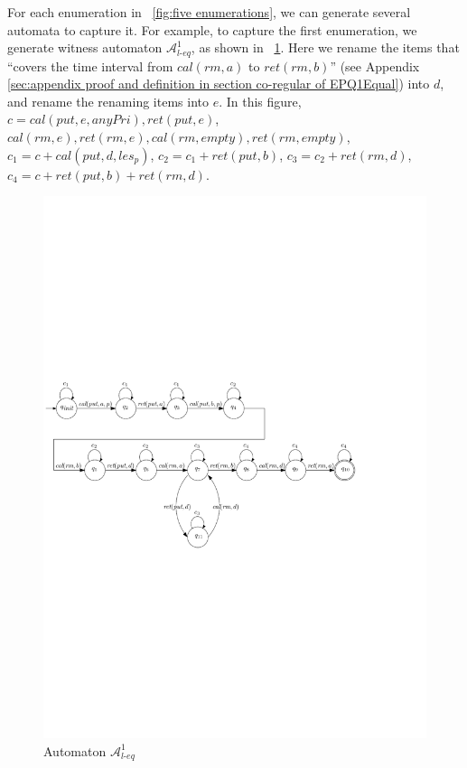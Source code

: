 For each enumeration in \figurename~\ref{fig:five enumerations}, we can generate several automata to capture it. For example, to capture the first enumeration, we generate witness automaton $\mathcal{A}_{\textit{l-eq}}^1$, as shown in \figurename~\ref{fig:automata for first enumeration of PQ1Equal not in appendix}. Here we rename the items that ``covers the time interval from $\textit{cal}(\textit{rm},a)$ to $\textit{ret}(\textit{rm},b)$'' (see Appendix \ref{sec:appendix proof and definition in section co-regular of EPQ1Equal}) into $d$, and rename the renaming items into $e$. In this figure, $c = \textit{cal}(\textit{put},e,\textit{anyPri}),\textit{ret}(\textit{put},e)$, $\textit{cal}(\textit{rm},e), \textit{ret}(\textit{rm},e),\textit{cal}(\textit{rm},\textit{empty}),\textit{ret}(\textit{rm},\textit{empty})$, $c_1 = c + \textit{cal}(\textit{put},d,\textit{les}_p)$, $c_2 = c_1 + \textit{ret}(\textit{put},b)$, $c_3 = c_2 + \textit{ret}(\textit{rm},d)$, $c_4 = c + \textit{ret}(\textit{put},b) + \textit{ret}(\textit{rm},d)$.

\begin{figure}[htbp]
  \centering
  \includegraphics[width=0.8 \textwidth]{figures/PIC_AUTO_PQ1Equ-1.pdf}
  \caption{Automaton $\mathcal{A}_{\textit{l-eq}}^1$}
  \label{fig:automata for first enumeration of PQ1Equal not in appendix}
\end{figure}

